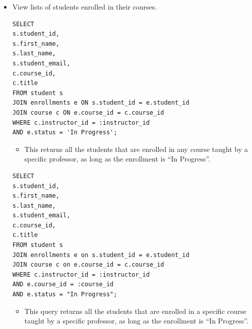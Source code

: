 \documentclass{report}
\begin{document}
\begin{itemize}
    
    \item View lists of students enrolled in their courses.
    \begin{lstlisting}
SELECT
s.student_id,
s.first_name,
s.last_name,
s.student_email,
c.course_id,
c.title
FROM student s
JOIN enrollments e ON s.student_id = e.student_id
JOIN course c ON e.course_id = c.course_id
WHERE c.instructor_id = :instructor_id
AND e.status = 'In Progress';
    \end{lstlisting}
    \begin{itemize}
        \item This returns all the students that are enrolled in any course taught by a specific professor, as long as the enrollment is ``In Progress''.
    \end{itemize}
    \begin{lstlisting}
SELECT
s.student_id,
s.first_name,
s.last_name,
s.student_email,
c.course_id,
c.title
FROM student s
JOIN enrollments e on s.student_id = e.student_id
JOIN course c on e.course_id = c.course_id
WHERE c.instructor_id = :instructor_id
AND e.course_id = :course_id
AND e.status = "In Progress";
    \end{lstlisting}
    \begin{itemize}
        \item This query returns all the students that are enrolled in a specific course taught by a specific professor, as long as the enrollment is ``In Progress''.
    \end{itemize}
    

\end{itemize}
\end{document}
